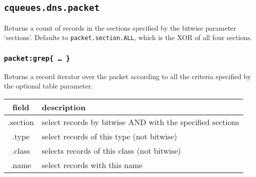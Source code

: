 \documentclass[11pt, oneside]{memoir}
\newcommand{\fn}[1]{\texttt{#1} }
\newcounter{toccols}
\newenvironment{Module}[1]{
	\subsection{\texttt{#1}}
	\addtocontents{toc}{
		\protect\begin{multicols}{\value{toccols}}
	}
}{
	\addtocontents{toc}{\protect\end{multicols}}
}
\begin{document}
\begin{Module}{cqueues.dns.packet}
Returns a count of records in the sections specified by the bitwise parameter `sections'. Defaults to \texttt{packet.section.ALL}, which is the XOR of all four sections.

\subsubsection[\fn{packet:grep}]{\fn{packet:grep\{ … \}}}

Returns a record iterator over the packet according to all the criteria specified by the optional table parameter.

\begin{tabular}{ c | l }
field & description\\\hline
.section & select records by bitwise AND with the specified sections\\
.type & select records of this type (not bitwise)\\
.class & selects records of this class (not bitwise)\\
.name & select records with this name
\end{tabular}

\end{Module}
\end{document}
